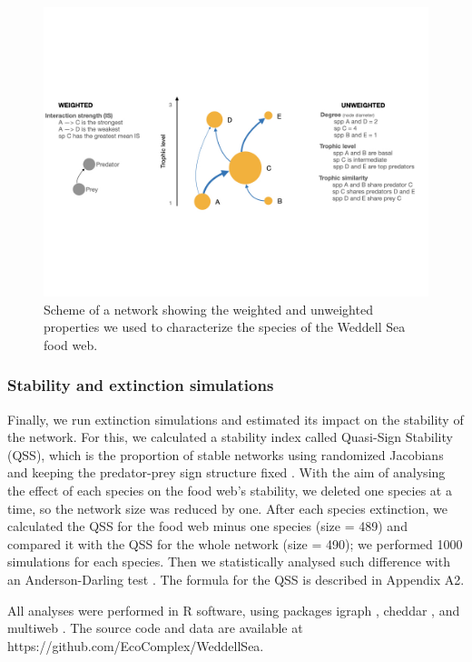\documentclass[gc, manuscript]{copernicus}
\begin{document}
\begin{figure}
\includegraphics[width=12cm]{ToyFoodWeb} \caption{Scheme of a network showing the weighted and unweighted properties we used to characterize the species of the Weddell Sea food web.}\label{fig:unnamed-chunk-2}
\end{figure}

\subsubsection{Stability and extinction simulations}

Finally, we run extinction simulations and estimated its impact on the
stability of the network. For this, we calculated a stability index
called Quasi-Sign Stability (QSS), which is the proportion of stable
networks using randomized Jacobians and keeping the predator-prey sign
structure fixed \citep{Allesina2008}. With the aim of analysing the
effect of each species on the food web's stability, we deleted one
species at a time, so the network size was reduced by one. After each
species extinction, we calculated the QSS for the food web minus one
species (size = 489) and compared it with the QSS for the whole network
(size = 490); we performed 1000 simulations for each species. Then we
statistically analysed such difference with an Anderson-Darling test
\citep{Scholz1987}. The formula for the QSS is described in Appendix A2.

All analyses were performed in R software, using packages igraph
\citep{Csardi2005}, cheddar \citep{Hudson2013}, and multiweb
\citep{Saravia2019}. The source code and data are available at
https://github.com/EcoComplex/WeddellSea.
\end{document}
